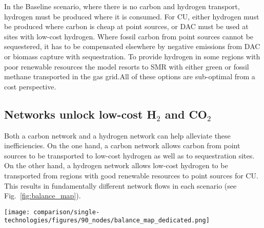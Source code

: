 \documentclass[twocolumn]{article}
\newcommand{\carbon}{CO$_2$}
\newcommand{\hydrogen}{H$_2$}
\newcommand{\carbongrid}{CO$_2$\=/Grid}
\newcommand{\baselinescenario}{Baseline scenario}
\newcommand{\hydrogenscenario}{H$_2$\=/Grid scenario}
\begin{document}
In the \baselinescenario{}, where there is no carbon and hydrogen transport, hydrogen must be produced where it is consumed. For CU, either hydrogen must be produced where carbon is cheap at point sources, or DAC must be used at sites with low-cost hydrogen. Where fossil carbon from point sources cannot be sequestered, it has to be compensated elsewhere by negative emissions from DAC or biomass capture with sequestration. To provide hydrogen in some regions with poor renewable resources the model resorts to SMR with either green or fossil methane transported in the gas grid.All of these options are sub-optimal from a cost perspective.

\subsection*{Networks unlock low-cost \hydrogen{} and \carbon{}}

Both a carbon network and a hydrogen network can help alleviate these inefficiencies. On the one hand, a carbon network allows carbon from point sources to be transported to low-cost hydrogen as well as to sequestration sites. On the other hand, a hydrogen network allows low-cost hydrogen to be transported from regions with good renewable resources to point sources for CU. This results in fundamentally different network flows in each scenario (see Fig.~\ref{fig:balance_map}).


\begin{figure*}[ht!]
    \centering
    \texttt{[image: comparison/single-technologies/figures/90\_nodes/balance\_map\_dedicated.png]}
    \caption{Average production, consumption, flows and prices of the carbon (top line) and hydrogen (bottom line) sectors in the \carbongrid{} (left) and the \hydrogenscenario{} (right). For each region, upper semicircles show the average production per technology, lower semicircles the consumption, and colors the average marginal prices. Lines and arrows show the interregional transportation. Carbon sequestration offshore is drawn in full circles.
    }
    \label{fig:balance_map}
\end{figure*}
\end{document}

